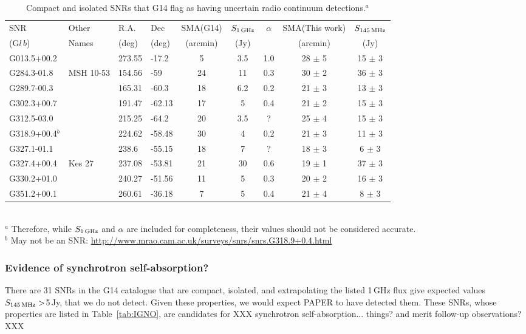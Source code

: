 \documentclass[useAMS,usenatbib]{mn2e}
\begin{document}
\begin{table}
\caption{Compact and isolated SNRs that G14 flag as having uncertain radio continuum detections.$^a$}
\begin{tabular}{llllccccc}
\hline
SNR	&	Other	&	R.A.	&	Dec	&	SMA(G14)	&	$S_{1\,{\rm GHz}}$ &	$\alpha$ 	&	SMA(This work)			&	$S_{145\,{\rm MHz}}$			\\
(G$l\,b$)	&	Names	&	(deg)	&	(deg)	&	(arcmin)	&	(Jy)	&		&	(arcmin)			&	(Jy)			\\
\hline			
G013.5+00.2	&		&	273.55	&	-17.2	&	5	&	3.5	&	1.0	&	28	$\pm$	5	&	15	$\pm$	3	\\
G284.3-01.8	&	MSH 10-53	&	154.56	&	-59	&	24	&	11	&	0.3	&	30	$\pm$	2	&	36	$\pm$	3	\\
G289.7-00.3	&		&	165.31	&	-60.3	&	18	&	6.2	&	0.2	&	21	$\pm$	3	&	13	$\pm$	3	\\
G302.3+00.7	&		&	191.47	&	-62.13	&	17	&	5	&	0.4	&	21	$\pm$	2	&	15	$\pm$	3	\\
G312.5-03.0	&		&	215.25	&	-64.2	&	20	&	3.5	&	?	&	25	$\pm$	4	&	15	$\pm$	3	\\
G318.9+00.4$^b$	&		&	224.62	&	-58.48	&	30	&	4	&	0.2	&	21	$\pm$	3	&	11	$\pm$	3	\\
G327.1-01.1	&		&	238.6	&	-55.15	&	18	&	7	&	?	&	18	$\pm$	3	&	6	$\pm$	3	\\
G327.4+00.4	&	Kes 27	&	237.08	&	-53.81	&	21	&	30	&	0.6	&	19	$\pm$	1	&	37	$\pm$	3	\\
G330.2+01.0	&		&	240.27	&	-51.56	&	11	&	5	&	0.3	&	20	$\pm$	2	&	16	$\pm$	3	\\
G351.2+00.1	&		&	260.61	&	-36.18	&	7	&	5	&	0.4	&	21	$\pm$	4	&	8	$\pm$	3	\\
\hline
\end{tabular}
\\
$^a$ Therefore, while $S_{1\,{\rm GHz}}$ and	$\alpha$ are included for completeness, their values should not be considered accurate.\\
$^b$ May not be an SNR: \url{http://www.mrao.cam.ac.uk/surveys/snrs/snrs.G318.9+0.4.html}\\
\label{tab:G14uncertain}
\end{table}

\subsubsection{Evidence of synchrotron self-absorption?}

There are 31 SNRs in the G14 catalogue that are compact, isolated, and extrapolating the listed 1\,GHz flux give expected values $S_{145\,{\rm MHz}}>$5\,Jy, that we do not detect. Given these properties, we would expect PAPER to have detected them. These SNRs, whose properties are listed in Table~\ref{tab:IGNO}, are candidates for XXX synchrotron self-absorption... things?  and merit follow-up observations? XXX
\end{document}
